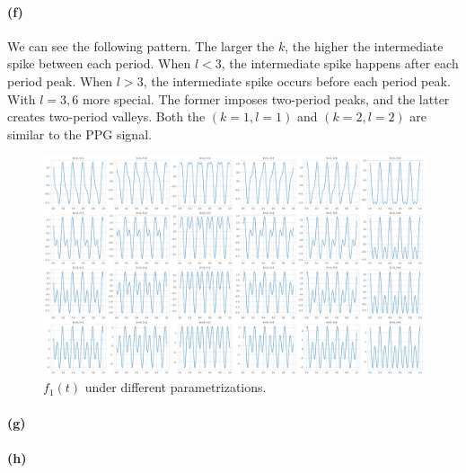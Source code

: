 \documentclass[11pt, letterpaper]{article}
\begin{document}
\paragraph{(f)}
We can see the following pattern. The larger the $k$, the higher the intermediate spike between each period. When $l < 3$, the intermediate spike happens after each period peak. When $l > 3$, the intermediate spike occurs before each period peak. With $l = {3, 6}$ more special. The former imposes two-period peaks, and the latter creates two-period valleys. Both the $(k=1, l=1)$ and $(k=2, l=2)$ are similar to the PPG signal.
\begin{figure}[!h]
  \centering
  \includegraphics[width=1.0\textwidth]{plot7.png}
  \captionsetup{justification=centering}
  \caption{$f_1(t)$ under different parametrizations.}
  \label{fig:f1t_kl_parametrization}
\end{figure}

\paragraph{(g)}


\paragraph{(h)}
\end{document}

